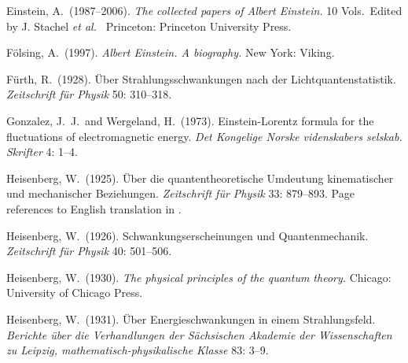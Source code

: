 \documentclass[12pt]{elsart}
\begin{document}
{\begin{thebibliography}{}

 Einstein, A.\ (1987--2006). {\it The collected papers of Albert Einstein.} 10 Vols.\ Edited by J. Stachel {\it et al.\ } Princeton: Princeton University Press.

 F\"olsing, A.\ (1997). {\it Albert Einstein. A biography.} New York: Viking.

 F\"urth, R.\ (1928). \"Uber Strahlungsschwankungen nach der Lichtquantenstatistik.  {\it Zeitschrift f\"{u}r Physik} 50: 310--318.


 Gonzalez, J.\ J.\  and Wergeland, H.\  (1973). Einstein-Lorentz formula for the fluctuations of electromagnetic energy. {\it Det Kongelige Norske videnskabers selskab. Skrifter} 4: 1--4.


 Heisenberg, W.\ (1925). \"{U}ber die quantentheoretische Umdeutung kinematischer und mechanischer Beziehungen. {\it Zeitschrift f\"{u}r Physik} 33: 879--893. Page references to English translation in \citep[pp.\ 261--276]{Van der Waerden}.


 Heisenberg, W.\ (1926). Schwankungserscheinungen und Quantenmechanik. {\it Zeitschrift f\"{u}r Physik} 40: 501--506. 

 Heisenberg, W.\ (1930). {\it The physical principles of the quantum theory.} Chicago: University of Chicago Press.


 Heisenberg, W.\ (1931). \"Uber Energieschwankungen in einem Strahlungsfeld. {\it Berichte \"uber die Verhandlungen der 
S\"achsischen Akademie der Wissenschaften zu Leipzig, mathematisch-physikalische Klasse} 83: 3--9. %


\end{thebibliography}}
\end{document}
